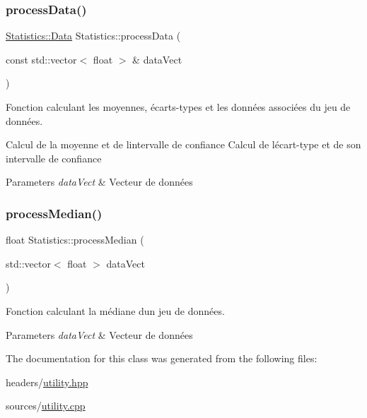 \subsubsection{\texorpdfstring{process\+Data()}{processData()}}
{\footnotesize\ttfamily \hyperlink{structStatistics_1_1Data}{Statistics\+::\+Data} Statistics\+::process\+Data (\begin{DoxyParamCaption}\item[{const std\+::vector$<$ float $>$ \&}]{data\+Vect }\end{DoxyParamCaption})\hspace{0.3cm}{\ttfamily [static]}}



Fonction calculant les moyennes, écarts-\/types et les données associées du jeu de données. 

Calcul de la moyenne et de l\textquotesingle{}intervalle de confiance Calcul de l\textquotesingle{}écart-\/type et de son intervalle de confiance 
\begin{DoxyParams}{Parameters}
{\em data\+Vect} & Vecteur de données \\
\hline
\end{DoxyParams}
\mbox{\label{classStatistics_ae1c12077162711aa0ea8b4ee6e15b4da}} 
\subsubsection{\texorpdfstring{process\+Median()}{processMedian()}}
{\footnotesize\ttfamily float Statistics\+::process\+Median (\begin{DoxyParamCaption}\item[{std\+::vector$<$ float $>$}]{data\+Vect }\end{DoxyParamCaption})\hspace{0.3cm}{\ttfamily [static]}}



Fonction calculant la médiane d\textquotesingle{}un jeu de données. 


\begin{DoxyParams}{Parameters}
{\em data\+Vect} & Vecteur de données \\
\hline
\end{DoxyParams}


The documentation for this class was generated from the following files\+:\begin{DoxyCompactItemize}
\item 
headers/\hyperlink{utility_8hpp}{utility.\+hpp}\item 
sources/\hyperlink{utility_8cpp}{utility.\+cpp}\end{DoxyCompactItemize}
